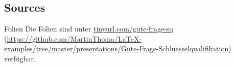 \subsection{Sources}
\begin{frame}{Folien}
    Die Folien sind unter \url{tinyurl.com/gute-frage-sq} (\url{https://github.com/MartinThoma/LaTeX-examples/tree/master/presentations/Gute-Frage-Schluesselqualifikation})
    verfügbar.
\end{frame}
